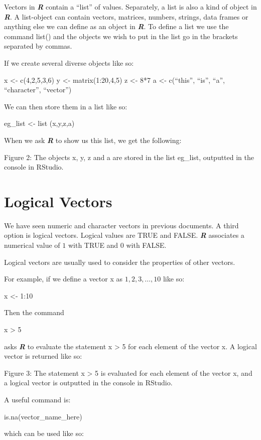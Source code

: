 \documentclass[
]{book}
\begin{document}
Vectors in \textbf{\emph{R}} contain a ``list'' of values. Separately, a list is also a kind of object in \textbf{\emph{R}}. A list-object can contain vectors, matrices, numbers, strings, data frames or anything else we can define as an object in \textbf{\emph{R}}. To define a list we use the command list() and the objects we wish to put in the list go in the brackets separated by commas.

If we create several diverse objects like so:

x \textless- c(4,2,5,3,6)
y \textless- matrix(1:20,4,5)
z \textless- 8*7
a \textless- c(``this'', ``is'', ``a'', ``character'', ``vector'')

We can then store them in a list like so:

eg\_list \textless- list (x,y,z,a)

When we ask \textbf{\emph{R}} to show us this list, we get the following:

Figure 2: The objects x, y, z and a are stored in the list eg\_list, outputted in the console in RStudio.

\section{Logical Vectors}\label{logical-vectors}

We have seen numeric and character vectors in previous documents. A third option is logical vectors. Logical values are TRUE and FALSE. \textbf{\emph{R}} associates a numerical value of \(1\) with TRUE and \(0\) with FALSE.

Logical vectors are usually used to consider the properties of other vectors.

For example, if we define a vector x as \(1, 2, 3, \ldots, 10\) like so:

x \textless- 1:10

Then the command

x \textgreater{} 5

asks \textbf{\emph{R}} to evaluate the statement x \textgreater{} 5 for each element of the vector x. A logical vector is returned like so:

Figure 3: The statement x \textgreater{} 5 is evaluated for each element of the vector x, and a logical vector is outputted in the console in RStudio.

A useful command is:

is.na(vector\_name\_here)

which can be used like so:
\end{document}
